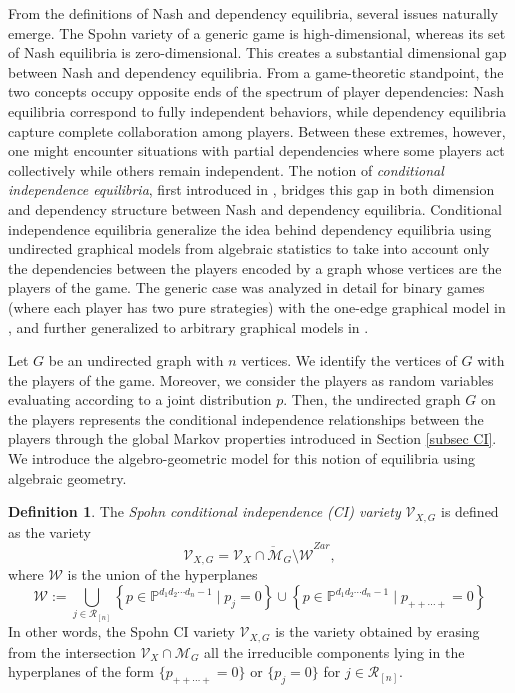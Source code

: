 \documentclass[11pt]{amsart}
\numberwithin{equation}{section}
\theoremstyle{plain}
\numberwithin{theorem}{section}
\theoremstyle{definition}
\newtheorem{definition}[theorem]{Definition}
\begin{document}
From the definitions of Nash and dependency equilibria, several issues naturally emerge. The Spohn variety of a generic game is high-dimensional, whereas its set of Nash equilibria is zero-dimensional. This creates a substantial dimensional gap between Nash and dependency equilibria. From a game-theoretic standpoint, the two concepts occupy opposite ends of the spectrum of player dependencies: Nash equilibria correspond to fully independent behaviors, while dependency equilibria capture complete collaboration among players. Between these extremes, however, one might encounter situations with partial dependencies where some players act collectively while others remain independent. The notion of \emph{conditional independence equilibria}, first introduced in \cite[Section 6]{portakal2022geometry}, bridges this gap in both dimension and dependency structure between Nash and dependency equilibria. Conditional independence equilibria generalize the idea behind dependency equilibria using undirected graphical models from algebraic statistics to take into account only the dependencies between the players encoded by a graph whose vertices are the players of the game. The generic case was analyzed in detail for binary games (where each player has two pure strategies) with the one-edge graphical model in \cite{portakal2024nash}, and further generalized to arbitrary graphical models in \cite{portakal2024game}.

Let $G$ be an undirected graph with $n$ vertices. We identify the vertices of $G$ with the players of the game. Moreover, we consider the players as random variables evaluating according to a joint distribution $p$. Then, the undirected graph $G$ on the players represents the conditional independence relationships between the players through the global Markov properties introduced in Section \ref{subsec CI}. We introduce the algebro-geometric model for this notion of equilibria using algebraic geometry.


\begin{definition}\label{Definition 1.25}
The \textit{Spohn conditional independence (CI) variety} $\mathcal V_{X,G}$ is defined as the variety
\[
\mathcal V_{X,G}=\overline{\mathcal V_X\cap\mathcal M_G\setminus \mathcal W}^{Zar},
\]
where $\mathcal W$ is the union of the hyperplanes
\[
\displaystyle \mathcal W:=
\bigcup_{j\in\mathcal R_{[n]}}\left\{p\in\mathbb P^{d_1 d_2 \cdots d_n-1}\mid p_j=0\right\}\cup \left\{p\in\mathbb P^{d_1 d_2 \cdots d_n-1}\mid p_{++\cdots+}=0\right\}
\]
In other words, the Spohn CI variety $\mathcal V_{X,G}$ is the variety obtained by erasing from the intersection $\mathcal V_X\cap\mathcal M_G$ all the irreducible components lying in the hyperplanes of the form $\{ p_{++\cdots+}=0\}$ or $\{p_j=0\}$ for $j\in\mathcal{R}_{[n]}$.
\end{definition}
\end{document}
